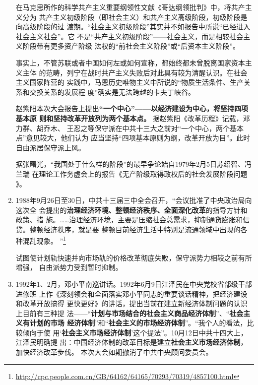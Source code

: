 \begin{enumerate}
  在马克思所作的科学共产主义重要纲领性文献《哥达纲领批判》中，将共产主义分为
  共产主义初级阶段（即社会主义）和共产主义高级阶段，初级阶段是向高级阶段的过
  渡期。“社会主义初级阶段”其实并不如报告中所说“已经进入社会主义社会”。它
  不是“共产主义初级阶段”——社会主义，而是相较社会主义阶段带有更多资产阶级
  法权的“前社会主义阶段”或“后资本主义阶段”。


  事实上，不管苏联或者中国如何左或如何宣称，都始终都未曾脱离国家资本主义主体
  的范畴，列宁在战时共产主义失败后对此具有较为清醒认识。在社会主义国家阵营的
  实践中，马恩历史唯物主义中所说的“物质生活条件、生产关系和交换关系的发展程
  度”确实是无法跨越的卡夫丁峡谷。

  赵紫阳本次大会报告上提出\textbf{“一个中心”——以经济建设为中心，将坚持四项基本原
  则和坚持改革开放列为两个基本点。} 据赵紫阳《改革历程》记载，邓力群、胡乔木、
  王忍之等保守派在中共十三大之前对“一个中心，两个基本点”意见较大，他们认为
  应当坚持“四项基本原则为纲，改革开放为目”。此时自由派居保守派上风。

  据张曙光，“我国处于什么样的阶段”的最早争论始自1979年2月5日苏绍智、冯兰瑞
  在理论工作务虚会上的报告《无产阶级取得政权后的社会发展阶段问题
  》。

\item 1988年9月26日至30日，中共十三届三中全会召开，“会议批准了中央政治局向这次全
  会提出的\textbf{治理经济环境、整顿经济秩序、全面深化改革}的指导方针和政策、措
  施。……治理经济环境，主要是压缩社会总需求，抑制通货膨胀和信贷。整顿经济秩序，就是要
  整顿目前经济生活中特别是流通领域中出现的各种混乱现象。
  ”\footnote{\url{http://cpc.people.com.cn/GB/64162/64165/70293/70319/4857100.html}}

  试图使计划轨快速并向市场轨的价格改革彻底失败，保守派势力相较之前有所增强，
  自由派势力受到暂时抑制。

\item 1992年1、2月，邓小平南巡讲话。1992年6月9日江泽民在中央党校省部级干部进修班
  上作《深刻领会和全面落实邓小平同志的重要谈话精神，把经济建设和改革开放搞得
  更快更好》的讲话，提出当前在建立新经济体制问题的认识上目前有三种提
  法——“\textbf{计划与市场结合的社会主义商品经济体制}”、“\textbf{社会主义有计划的市场
    经济体制}”和“\textbf{社会主义的市场经济体制}”。“我个人的看法，比较倾向于使
  用‘\textbf{社会主义市场经济体制}’这个提法”。10月12日中共十四大上，江泽民明确提
  出：中国经济体制的改革目标是建立\textbf{社会主义市场经济体制}，加快经济改革步伐。
  本次大会如期撤消了中共中央顾问委员会。
\end{enumerate}

